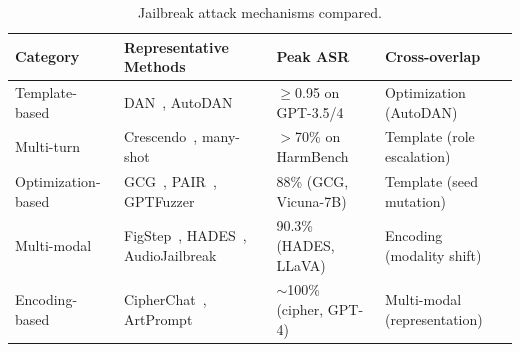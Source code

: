 
\begin{table}[htbp]
\centering
\caption{Jailbreak attack mechanisms compared.}
\label{tab:jailbreak}

\fontsize{7}{9}\selectfont
\setlength{\tabcolsep}{5pt}
\renewcommand{\arraystretch}{1.3}

\begin{tabular}{l l l l}
\toprule
\textbf{Category} & \textbf{Representative Methods} & \textbf{Peak ASR} & \textbf{Cross-overlap} \\
\midrule

\rowcolor{rowgray}
Template-based
  & DAN~\cite{zhang2024dananything}, AutoDAN~\cite{liu2024autodan}
  & $\geq$0.95 on GPT-3.5/4
  & Optimization (AutoDAN) \\

Multi-turn
  & Crescendo~\cite{russinovich2025crescendo}, many-shot~\cite{anil2024manyshot}
  & $>$70\% on HarmBench
  & Template (role escalation) \\

\rowcolor{rowgray}
Optimization-based
  & GCG~\cite{zou2023gcg}, PAIR~\cite{chao2024pair}, GPTFuzzer~\cite{yu2023gptfuzzer}
  & 88\% (GCG, Vicuna-7B)
  & Template (seed mutation) \\

Multi-modal
  & FigStep~\cite{gong2025figstep}, HADES~\cite{li2024hades}, AudioJailbreak~\cite{chen2025audiojailbreak}
  & 90.3\% (HADES, LLaVA)
  & Encoding (modality shift) \\

\rowcolor{rowgray}
Encoding-based
  & CipherChat~\cite{yuan2024cipherchat}, ArtPrompt~\cite{jiang2024artprompt}
  & $\sim$100\% (cipher, GPT-4)
  & Multi-modal (representation) \\

\bottomrule
\end{tabular}
\end{table}
